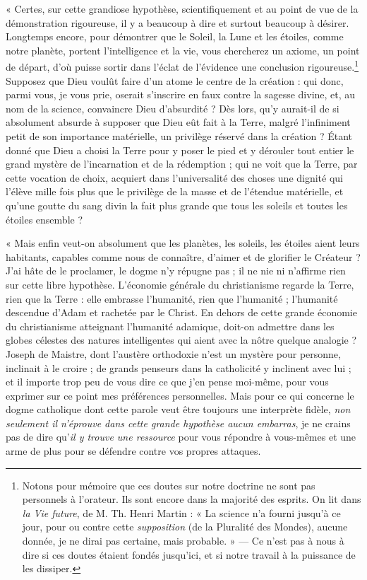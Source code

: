 \documentclass[a4paper, 11pt, oneside, landscape]{article}
\begin{document}
« Certes, sur cette grandiose hypothèse, scientifiquement et au point de vue de la démonstration rigoureuse, il y a beaucoup à dire et surtout beaucoup à désirer. Longtemps encore, pour démontrer que le Soleil, la Lune et les étoiles, comme notre planète, portent l'intelligence et la vie, vous chercherez un axiome, un point de départ, d'où puisse sortir dans l'éclat de l'évidence une conclusion rigoureuse.\footnote{Notons pour mémoire que ces doutes sur notre doctrine ne sont pas personnels à l'orateur. Ils sont encore dans la majorité des esprits. On lit dans \emph{la Vie future}, de M. Th. Henri Martin : « La science n'a fourni jusqu'à ce jour, pour ou contre cette \emph{supposition} (de la Pluralité des Mondes), aucune donnée, je ne dirai pas certaine, mais probable. » --- Ce n'est pas à nous à dire si ces doutes étaient fondés jusqu'ici, et si notre travail à la puissance de les dissiper.} Supposez que Dieu voulût faire d'un atome le centre de la création : qui donc, parmi vous, je vous prie, oserait s'inscrire en faux contre la sagesse divine, et, au nom de la science, convaincre Dieu d'absurdité ? Dès lors, qu'y aurait-il de si absolument absurde à supposer que Dieu eût fait à la Terre, malgré l'infiniment petit de son importance matérielle, un privilège réservé dans la création ? Étant donné que Dieu a choisi la Terre pour y poser le pied et y dérouler tout entier le grand mystère de l'incarnation et de la rédemption ; qui ne voit que la Terre, par cette vocation de choix, acquiert dans l'universalité des choses une dignité qui l'élève mille fois plus que le privilège de la masse et de l'étendue matérielle, et qu'une goutte du sang divin la fait plus grande que tous les soleils et toutes les étoiles ensemble ?

« Mais enfin veut-on absolument que les planètes, les soleils, les étoiles aient leurs habitants, capables comme nous de connaître, d'aimer et de glorifier le Créateur ? J'ai hâte de le proclamer, le dogme n'y répugne pas ; il ne nie ni n'affirme rien sur cette libre hypothèse. L'économie générale du christianisme regarde la Terre, rien que la Terre : elle embrasse l'humanité, rien que l'humanité ; l'humanité descendue d'Adam et rachetée par le Christ. En dehors de cette grande économie du christianisme atteignant l'humanité adamique, doit-on admettre dans les globes célestes des natures intelligentes qui aient avec la nôtre quelque analogie ? Joseph de Maistre, dont l'austère orthodoxie n'est un mystère pour personne, inclinait à le croire ; de grands penseurs dans la catholicité y inclinent avec lui ; et il importe trop peu de vous dire ce que j'en pense moi-même, pour vous exprimer sur ce point mes préférences personnelles. Mais pour ce qui concerne le dogme catholique dont cette parole veut être toujours une interprète fidèle, \emph{non seulement il n'éprouve dans cette grande hypothèse aucun embarras}, je ne crains pas de dire qu'\emph{il y trouve une ressource} pour vous répondre à vous-mêmes et une arme de plus pour se défendre contre vos propres attaques.
\end{document}
